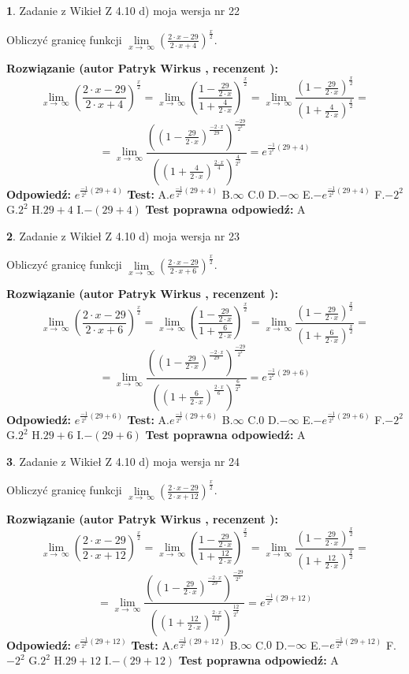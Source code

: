 \documentclass[12pt, a4paper]{article}
\theoremstyle{definition} %
\newtheorem{zad}{}
\newcommand{\zadStart}[1]{\begin{zad}#1\newline}
\newcommand{\zadStop}{\end{zad}}
\newcommand{\rozwStart}[2]{\noindent \textbf{Rozwiązanie (autor #1 , recenzent #2): }\newline}
\newcommand{\rozwStop}{\newline}
\newcommand{\odpStart}{\noindent \textbf{Odpowiedź:}\newline}
\newcommand{\odpStop}{\newline}
\newcommand{\testStart}{\noindent \textbf{Test:}\newline}
\newcommand{\testStop}{\newline}
\newcommand{\kluczStart}{\noindent \textbf{Test poprawna odpowiedź:}\newline}
\newcommand{\kluczStop}{\newline}
\begin{document}
\zadStart{Zadanie z Wikieł Z 4.10 d) moja wersja nr 22}


Obliczyć granicę funkcji  $\lim\limits_{x\to\ \infty}(\frac{2\cdot x-29}{2\cdot x+4})^{\frac{x}{2}}$.
\zadStop
\rozwStart{Patryk Wirkus}{}
$$\lim\limits_{x\to\ \infty}(\frac{2\cdot x-29}{2\cdot x+4})^{\frac{x}{2}} = \lim\limits_{x\to\ \infty}(\frac{1-\frac{29}{2\cdot x}}{1+\frac{4}{2\cdot x}})^{\frac{x}{2}}=\lim\limits_{x\to\ \infty}\frac{(1-\frac{29}{2\cdot x})^{\frac{x}{2}}}{(1+\frac{4}{2\cdot x})^{\frac{x}{2}}}=$$
$$=\lim\limits_{x\to\ \infty}\frac{((1-\frac{29}{2\cdot x})^{\frac{-2\cdot x}{29}})^{\frac{-29}{2^{2}}}}{((1+\frac{4}{2\cdot x})^{\frac{2\cdot x}{4}})^{\frac{4}{2^{2}}}}=e^{\frac{-1}{2^{2}}(29+4)}$$
\rozwStop
\odpStart
$e^{\frac{-1}{2^{2}}(29+4)}$
\odpStop
\testStart
A.$e^{\frac{-1}{2^{2}}(29+4)}$ B.$\infty$ C.$0$ D.$-\infty$ E.$-e^{\frac{-1}{2^{2}}(29+4)}$
F.$-2^{2}$ G.$2^{2}$
H.$29+4$
I.$-(29+4)$
\testStop
\kluczStart
A
\kluczStop



\zadStart{Zadanie z Wikieł Z 4.10 d) moja wersja nr 23}


Obliczyć granicę funkcji  $\lim\limits_{x\to\ \infty}(\frac{2\cdot x-29}{2\cdot x+6})^{\frac{x}{2}}$.
\zadStop
\rozwStart{Patryk Wirkus}{}
$$\lim\limits_{x\to\ \infty}(\frac{2\cdot x-29}{2\cdot x+6})^{\frac{x}{2}} = \lim\limits_{x\to\ \infty}(\frac{1-\frac{29}{2\cdot x}}{1+\frac{6}{2\cdot x}})^{\frac{x}{2}}=\lim\limits_{x\to\ \infty}\frac{(1-\frac{29}{2\cdot x})^{\frac{x}{2}}}{(1+\frac{6}{2\cdot x})^{\frac{x}{2}}}=$$
$$=\lim\limits_{x\to\ \infty}\frac{((1-\frac{29}{2\cdot x})^{\frac{-2\cdot x}{29}})^{\frac{-29}{2^{2}}}}{((1+\frac{6}{2\cdot x})^{\frac{2\cdot x}{6}})^{\frac{6}{2^{2}}}}=e^{\frac{-1}{2^{2}}(29+6)}$$
\rozwStop
\odpStart
$e^{\frac{-1}{2^{2}}(29+6)}$
\odpStop
\testStart
A.$e^{\frac{-1}{2^{2}}(29+6)}$ B.$\infty$ C.$0$ D.$-\infty$ E.$-e^{\frac{-1}{2^{2}}(29+6)}$
F.$-2^{2}$ G.$2^{2}$
H.$29+6$
I.$-(29+6)$
\testStop
\kluczStart
A
\kluczStop



\zadStart{Zadanie z Wikieł Z 4.10 d) moja wersja nr 24}


Obliczyć granicę funkcji  $\lim\limits_{x\to\ \infty}(\frac{2\cdot x-29}{2\cdot x+12})^{\frac{x}{2}}$.
\zadStop
\rozwStart{Patryk Wirkus}{}
$$\lim\limits_{x\to\ \infty}(\frac{2\cdot x-29}{2\cdot x+12})^{\frac{x}{2}} = \lim\limits_{x\to\ \infty}(\frac{1-\frac{29}{2\cdot x}}{1+\frac{12}{2\cdot x}})^{\frac{x}{2}}=\lim\limits_{x\to\ \infty}\frac{(1-\frac{29}{2\cdot x})^{\frac{x}{2}}}{(1+\frac{12}{2\cdot x})^{\frac{x}{2}}}=$$
$$=\lim\limits_{x\to\ \infty}\frac{((1-\frac{29}{2\cdot x})^{\frac{-2\cdot x}{29}})^{\frac{-29}{2^{2}}}}{((1+\frac{12}{2\cdot x})^{\frac{2\cdot x}{12}})^{\frac{12}{2^{2}}}}=e^{\frac{-1}{2^{2}}(29+12)}$$
\rozwStop
\odpStart
$e^{\frac{-1}{2^{2}}(29+12)}$
\odpStop
\testStart
A.$e^{\frac{-1}{2^{2}}(29+12)}$ B.$\infty$ C.$0$ D.$-\infty$ E.$-e^{\frac{-1}{2^{2}}(29+12)}$
F.$-2^{2}$ G.$2^{2}$
H.$29+12$
I.$-(29+12)$
\testStop
\kluczStart
A
\kluczStop
\end{document}
